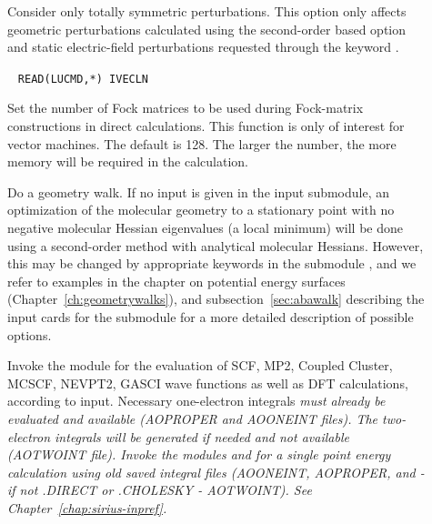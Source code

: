 \begin{description}
\item[] Consider only totally symmetric
perturbations.
This option only affects geometric perturbations calculated using the
second-order based  option and static
electric-field perturbations requested through the keyword .

\item[]\verb| |
\newline
\verb|READ(LUCMD,*) IVECLN|

Set the number of Fock matrices to be used during Fock-matrix constructions in
direct calculations. This function is only of interest for vector machines.
The default is 128. The larger the number, the more memory will be required
in the calculation.

\item[]
Do a geometry walk.
If no input is given in the
 input submodule, an optimization of the molecular
geometry to a stationary point with no negative molecular Hessian eigenvalues (a
local minimum) will be done using a second-order method with
analytical molecular Hessians. However, this may be changed by appropriate
keywords in the submodule , and we refer to examples in
the chapter on potential energy surfaces
(Chapter~\ref{ch:geometrywalks}), and subsection~\ref{sec:abawalk}
describing the input cards for the  submodule for a more
detailed description of possible options.

\item[]
Invoke the {\sir} module for the evaluation of SCF, MP2, Coupled
Cluster, MCSCF, NEVPT2, GASCI wave functions as well as DFT calculations, according to input.
Necessary one-electron integrals \em{must} already be evaluated and available (AOPROPER and AOONEINT files).
The two-electron integrals will be generated if needed and not available (AOTWOINT file).
Invoke the modules {\her} and {\sir} for a single point energy calculation using old saved integral files (AOONEINT, AOPROPER, and - if not .DIRECT or .CHOLESKY - AOTWOINT).
See Chapter~\ref{chap:sirius-inpref}.
\end{description}

%

